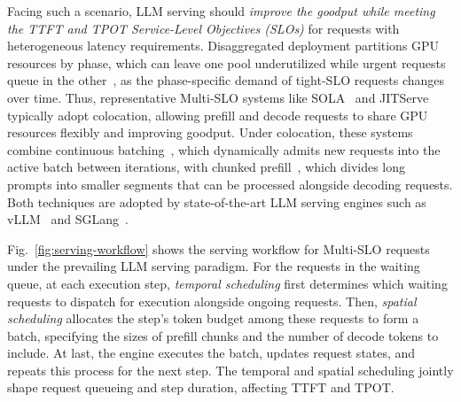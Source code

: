 Facing such a scenario, LLM serving should \textit{improve the goodput while meeting the TTFT and TPOT Service-Level Objectives (SLOs)} for requests with heterogeneous latency requirements.
Disaggregated deployment partitions GPU resources by phase, which can leave one pool underutilized while urgent requests queue in the other~\cite{ruan2026libra,wu2024loongserve}, as the phase-specific demand of tight-SLO requests changes over time.
Thus, representative Multi-SLO systems like SOLA~\cite{hong2025sola} and JITServe~\cite{zhang2026jitserve} typically adopt colocation, allowing prefill and decode requests to share GPU resources flexibly and improving goodput.
Under colocation, these systems combine continuous batching~\cite{yu2022orca}, which dynamically admits new requests into the active batch between iterations, with chunked prefill~\cite{agrawal2024sarathi}, which divides long prompts into smaller segments that can be processed alongside decoding requests.
Both techniques are adopted by state-of-the-art LLM serving engines such as vLLM~\cite{kwon2023vllm} and SGLang~\cite{zheng2024sglang}.


Fig.~\ref{fig:serving-workflow} shows the serving workflow for Multi-SLO requests under the prevailing LLM serving paradigm.
For the requests in the waiting queue, at each execution step, \emph{temporal scheduling} first determines which waiting requests to dispatch for execution alongside ongoing requests.
Then, \emph{spatial scheduling} allocates the step's token budget among these requests to form a batch, specifying the sizes of prefill chunks and the number of decode tokens to include.
At last, the engine executes the batch, updates request states, and repeats this process for the next step.
The temporal and spatial scheduling jointly shape request queueing and step duration, affecting TTFT and TPOT.

